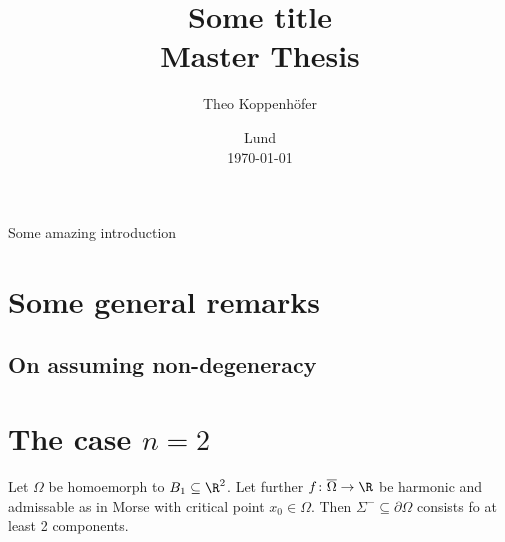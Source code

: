 




\title{ Some title \\[1ex]
	  \large Master Thesis}
\author{Theo Koppenhöfer}
\date{Lund \\[1ex] \today}



\usepackage{pythonhighlight}
\usepackage{pgfplots}
\graphicspath{{../Plots/}}


\newcommand{\bx}{\bar{x}}





\maketitle

Some amazing introduction
 
\newpage

\section*{Some general remarks}

\subsection*{On assuming non-degeneracy}

\newpage

\section*{The case $n=2$}

\begin{claim}
  Let $\Omega$ be homoemorph to $B_1\subseteq\R^2$. Let further $f\colon\overline{\Omega}\to\R$ be harmonic and admissable 
  as in Morse with critical point $x_0\in\Omega$. Then $\Sigma^-\subseteq\partial\Omega$ consists fo at least 2 components.
\end{claim}


